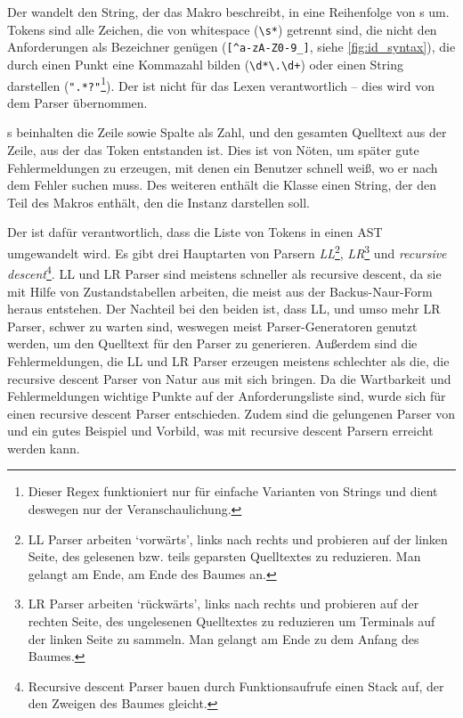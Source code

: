       Der  wandelt den String, der das Makro beschreibt, in eine Reihenfolge von s um. Tokens sind alle Zeichen, die von whitespace (\lstinline[language=MyRegex]$\s*$) getrennt sind, die nicht den Anforderungen als Bezeichner genügen (\lstinline[language=MyRegex]$[^a-zA-Z0-9_]$, siehe \autoref{fig:id_syntax}), die durch einen Punkt eine
      Kommazahl bilden (\lstinline[language=MyRegex]$\d*\.\d+$) oder einen String darstellen (\lstinline[language=MyRegex]$".*?"$\footnote{
        Dieser Regex funktioniert nur für einfache Varianten von Strings und dient deswegen nur der Veranschaulichung.
      }). Der  ist nicht für das Lexen verantwortlich -- dies wird von dem Parser übernommen.

      s beinhalten die Zeile sowie Spalte als Zahl, und den gesamten Quelltext aus der Zeile, aus der das Token entstanden ist. Dies ist von Nöten, um später gute Fehlermeldungen zu erzeugen, mit denen ein Benutzer schnell weiß, wo er nach dem Fehler suchen muss. Des weiteren enthält die Klasse einen String, der den Teil des Makros enthält, den die Instanz darstellen soll.

      Der  ist dafür verantwortlich, dass die Liste von Tokens in einen AST umgewandelt wird. Es gibt drei Hauptarten von Parsern\autocite[S.77\,f.]{eirund2013formale} \emph{LL}\footnote{
        LL Parser arbeiten `vorwärts', links nach rechts und probieren auf der linken Seite, des gelesenen bzw. teils geparsten Quelltextes zu reduzieren. Man gelangt am Ende, am Ende des Baumes an.
      }, \emph{LR}\footnote{
        LR Parser arbeiten `rückwärts', links nach rechts und probieren auf der rechten Seite, des ungelesenen Quelltextes zu reduzieren um Terminals auf der linken Seite zu sammeln. Man gelangt am Ende zu dem Anfang des Baumes.\autocite{cs143-stanford}
      } und \emph{recursive descent}\footnote{
        Recursive descent Parser bauen durch Funktionsaufrufe einen Stack auf, der den Zweigen des Baumes gleicht.
      }.
      LL und LR Parser sind meistens schneller als recursive descent, da sie mit Hilfe von Zustandstabellen arbeiten, die meist aus der Backus-Naur-Form heraus entstehen. Der Nachteil bei den beiden ist, dass LL, und umso mehr LR Parser, schwer zu warten sind, weswegen meist Parser-Generatoren genutzt werden, um den Quelltext für den Parser zu generieren. Außerdem sind die Fehlermeldungen, die LL und LR Parser erzeugen meistens schlechter als die, die recursive descent Parser von Natur aus mit sich bringen\autocite{scott2010gll}. Da die Wartbarkeit und Fehlermeldungen wichtige Punkte auf der Anforderungsliste sind, wurde sich für einen recursive descent Parser entschieden. Zudem sind die gelungenen Parser von  und  ein gutes Beispiel und Vorbild, was mit recursive descent Parsern erreicht werden kann.

